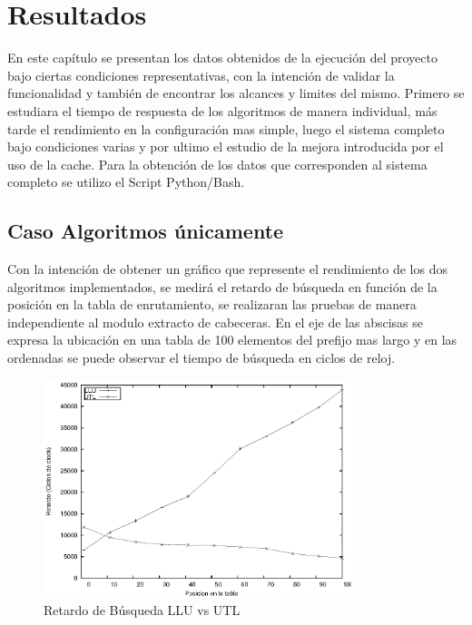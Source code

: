 \chapter{Resultados}

En este capítulo se presentan los datos obtenidos de la ejecución del proyecto bajo ciertas condiciones representativas, con la intención de validar la funcionalidad y también de encontrar los alcances y limites del mismo. Primero se estudiara el tiempo de respuesta de los algoritmos de manera individual, más tarde el rendimiento en la configuración mas simple, luego el sistema completo bajo condiciones varias y por ultimo el estudio de la mejora introducida por el uso de la cache. Para la obtención de los datos que corresponden al sistema completo se utilizo el Script Python/Bash.


\section{Caso Algoritmos únicamente}

Con la intención de obtener un gráfico que represente el rendimiento de los dos algoritmos implementados, se medirá el retardo de búsqueda en función de la posición en la tabla de enrutamiento, se realizaran las pruebas de manera independiente al modulo extracto de cabeceras. En el eje de las abscisas se expresa la ubicación en una tabla de 100 elementos del prefijo mas largo y en las ordenadas se puede observar el tiempo de búsqueda en ciclos de reloj.

\begin{figure}[h]
  \centering
	\includegraphics[width=0.8\textwidth]{5-resultados/graf/llu-utlsof.eps}
  \caption{Retardo de Búsqueda LLU vs UTL}
  \label{fig}
\end{figure}

